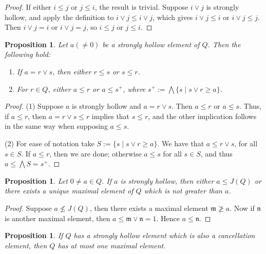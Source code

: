 \documentclass[11pt,english]{amsart}
\newtheorem{proposition}[theorem]{Proposition}
\theoremstyle{definition}
\numberwithin{equation}{section}
\theoremstyle{remark}
\def\leq{\leqslant}
\begin{document}
	\begin{proof}
		If either $i \leq j$ or $j \leq i$, the result is trivial.
		Suppose $i \vee j$ is strongly hollow, and apply the definition to $i \vee j \leq i \vee j$, which gives $i \vee j \leq i$ or $i \vee j \leq j$. Then $i \vee j = i$ or $i \vee j = j$, so $i \leq j$ or $j \leq i$.
	\end{proof}
	
	\begin{proposition}
		Let $a (\neq 0)$ be a strongly hollow element of $Q$. Then the following hold:
		\begin{enumerate}
			\item If $a = r \vee s$, then either $r \leq s$ or $s \leq r$.
			\item For $r \in Q$, either $a \leq r$ or $a \leq s^+$, where $s^+ := \bigwedge \{ s \mid s \vee r \geqslant a \}$.
		\end{enumerate}
	\end{proposition}
	
	\begin{proof}
		(1) Suppose $a$ is  strongly hollow and $a = r \vee s$. Then $a \leq r$ or $a \leq s$. Thus, if $a \leq r$, then $a = r \vee s \leq r$ implies that $s \leq r$, and the other implication follows in the same way when supposing $a \leq s$. 
		
		(2) For ease of notation take $S := \{s \mid s \vee r \geq a\}$. We have that $a \leq r \vee s$, for all $s \in S$. If $a \leq r$, then we are done; otherwise $a \leq s$ for all $s \in S$, and thus $a \leq \bigwedge S = s^+$.
	\end{proof}
	
	\begin{proposition}\label{T2.8}
		Let $0 \neq a \in Q$. If $a$ is strongly hollow, then either $a \leq J(Q)$ or there exists a unique maximal element of $Q$ which is not greater than $a$.
	\end{proposition}
	
	\begin{proof}
		Suppose $a \nleq J(Q)$, then there exists a maximal element $\mathfrak{m} \ngeq a$. Now if  $\mathfrak{n}$ is another maximal element, then $a \leq \mathfrak{m} \vee \mathfrak{n} = 1$. Hence $a \leq \mathfrak{n}$.
	\end{proof}
	
	\begin{proposition}\label{P2.9}
		If $Q$ has a strongly hollow element which is also a cancellation element, then $Q$ has at most one maximal element.
	\end{proposition}
	
\end{document}
